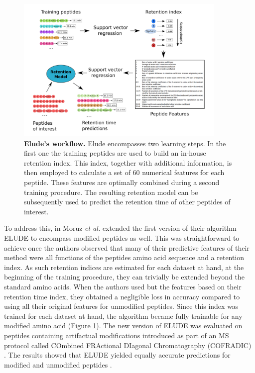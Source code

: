 \documentclass[a4paper]{article}
\begin{document}
\begin{figure}[!h]
\centering 
\includegraphics[width=0.9\textwidth]{img/elude-ptm.pdf}
\caption{\label{fig:elude} {\bf {\sc Elude}'s workflow.}  {\sc Elude} encompasses two learning steps. In the first one the training peptides are used to build an in-house retention index. This index, together with additional information, is then employed to calculate a set of 60 numerical features for each peptide. These features are optimally combined during a second training procedure. The resulting retention model can be subsequently used to predict the retention time of other peptides of interest.}
\end{figure}

To address this, in Moruz {\em et al.} \cite{elude2} extended the
first version of their algorithm {\sc ELUDE} to encompass modified
peptides as well. This was straightforward to achieve once the authors
observed that many of their predictive features of their method were
all functions of the peptides amino acid sequence and a retention
index. As such retention indices are estimated for each dataset at
hand, at the beginning of the training procedure, they can trivially
be extended beyond the standard amino acids. When the authors used but
the features based on their retention time index, they obtained a
negligible loss in accuracy compared to using all their original
features for unmodified peptides. Since this index was trained for
each dataset at hand, the algorithm became fully trainable for any
modified amino acid (Figure \ref{fig:elude}). The new version of {\sc
ELUDE} was evaluated on peptides containing artifactual modifications
introduced as part of an MS protocol called COmbined FRActional
DIagonal Chromatography (COFRADIC) \cite{Gevaert2002}. The results
showed that {\sc ELUDE} yielded equally accurate predictions for
modified and unmodified peptides \cite{elude2}.
\end{document}
